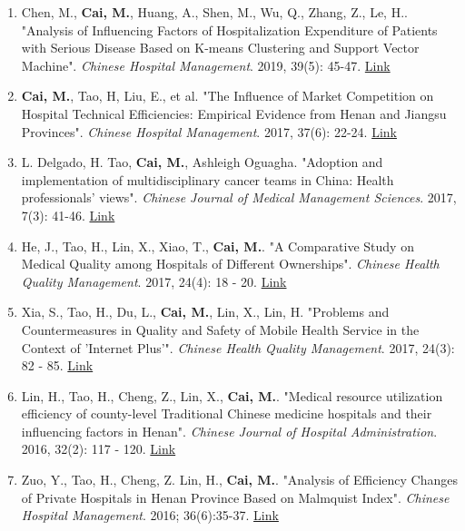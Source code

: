 \documentclass[11pt, a4paper]{article}
\newcommand{\years}[1]{\marginnote{\scriptsize #1}}
\begin{document}
	\begin{enumerate}[leftmargin=0ex,itemsep=1ex]
		\item \years{2019}Chen, M., \textbf{Cai, M.}, Huang, A., Shen, M., Wu, Q., Zhang, Z., Le, H.. "Analysis of Influencing Factors of Hospitalization Expenditure of Patients with Serious Disease Based on K-means Clustering and Support Vector Machine". \emph{Chinese Hospital Management}. 2019, 39(5): 45-47. \href{http://d.old.wanfangdata.com.cn/Periodical/zgyygl201905018}{Link}
		
		\item \years{2017}\textbf{Cai, 	M.}, Tao, H, Liu, E., et al. "The Influence of Market Competition on Hospital Technical Efficiencies: Empirical Evidence from Henan and Jiangsu Provinces". \emph{Chinese Hospital Management}. 2017, 37(6): 22-24. \href{http://www.cnki.com.cn/Article/CJFDTotal-YYGL201706012.htm}{Link}
		
		\item L. Delgado, H. Tao, \textbf{Cai, M.}, Ashleigh Oguagha. "Adoption and implementation of multidisciplinary cancer teams in China: Health professionals’ views". \emph{Chinese Journal of Medical Management Sciences}. 2017, 7(3): 41-46. \href{http://www.cnki.com.cn/Article/CJFDTOTAL-YLGL201703008.htm}{Link}
		
		\item He, J., Tao, H., Lin, X., Xiao, T., \textbf{Cai, M.}. "A Comparative Study on Medical Quality among Hospitals of Different Ownerships". \emph{Chinese Health Quality Management}. 2017, 24(4): 18 - 20. \href{http://www.cnki.com.cn/Article/CJFDTOTAL-WSJG201704010.htm}{Link}
		
		\item Xia, S., Tao, H., Du, L., \textbf{Cai, M.}, Lin, X., Lin, H. "Problems and Countermeasures in Quality and Safety of Mobile Health Service in the Context of 'Internet Plus'". \emph{Chinese Health Quality Management}. 2017, 24(3): 82 - 85. \href{http://www.cnki.com.cn/Article/CJFDTOTAL-WSJG201703030.htm}{Link}
		
		\item \years{2016}Lin, H., Tao, H., Cheng, Z., Lin, X., \textbf{Cai, M.}. "Medical resource utilization efficiency of county-level Traditional Chinese medicine hospitals and their influencing factors in Henan". \emph{Chinese Journal of Hospital Administration}. 2016, 32(2): 117 - 120. \href{http://xuewen.cnki.net/CMFD-1016781136.nh.html}{Link}
		
		\item Zuo, Y., Tao, H., Cheng, Z. Lin, H., \textbf{Cai, M.}. "Analysis of Efficiency Changes of Private Hospitals in Henan Province Based on Malmquist Index". \emph{Chinese Hospital Management}. 2016; 36(6):35-37. \href{http://www.cnki.com.cn/Article/CJFDTOTAL-YYGL201606020.htm}{Link}
		

\end{enumerate}
\end{document}
